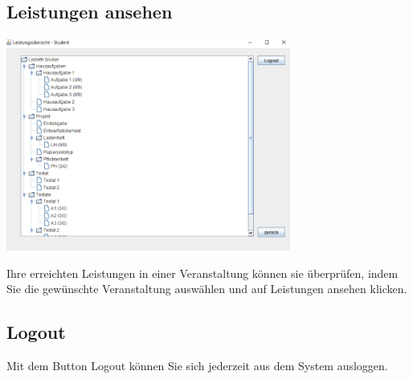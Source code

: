 \documentclass{Handbuch}
\begin{document}
\subsection{Leistungen ansehen}
\begin{center}
	\includegraphics[width=0.7\textwidth]{student4.png}
\end{center}
Ihre erreichten Leistungen in einer Veranstaltung können sie überprüfen, indem Sie die gewünschte Veranstaltung auswählen und auf \frqq Leistungen ansehen\flqq{} klicken.


\subsection{Logout}
Mit dem Button \frqq Logout\flqq{} können Sie sich jederzeit aus dem System ausloggen.
\end{document}
